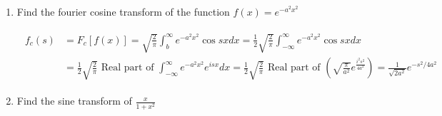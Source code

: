 \begin{enumerate}
\item	Find the fourier cosine transform of the function $f(x)=e^{-a^{2} x^{2}}$

\begin{answer}
	\begin{align*}
	\begin{aligned}
	f_{c}(s) &=F_{c}[f(x)]=\sqrt{\frac{2}{\pi}} \int_{b}^{\infty} e^{-a^{2} x^{2}} \cos s x d x=\frac{1}{2} \sqrt{\frac{2}{\pi}} \int_{-\infty}^{\infty} e^{-a^{2} x^{2}} \cos s x d x \\
	&=\frac{1}{2} \sqrt{\frac{2}{\pi}} \text { Real part of } \int_{-\infty}^{\infty} e^{-a^{2} x^{2}} e^{i s x} d x=\frac{1}{2} \sqrt{\frac{2}{\pi}} \text { Real part of }\left(\sqrt{\frac{\pi}{a^{2}}} e^{\frac{i^{2} s^{2}}{4 a^{2}}}\right)=\frac{1}{\sqrt{2 a^{2}}} e^{-s^{2} / 4 a^{2}}
	\end{aligned}
	\end{align*}
\end{answer}

\item	Find the sine transform of $\frac{x}{1+x^{2}}$


\end{enumerate}
